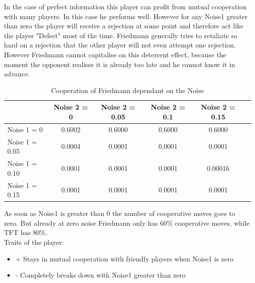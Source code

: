 In the case of perfect information this player can profit from mutual cooperation with many players. In this case he performs well. However for any Noise1 greater than zero the player will receive a rejection at some point and therefore act like the player "Defect" most of the time. Friedmann generally tries to retaliate so hard on a rejection that the other player will not even attempt one rejection. However Friedmann cannot capitalise on this deterrent effect, because the moment the opponent realises it is already too late and he cannot know it in advance.\\

\begin{table}[h]
 \begin{center}
\caption{Cooperation of Friedmann dependant on the Noise} \vspace{3mm}
\begin{tabular}{|l|c|c|c|c|c|}
\hline
   	& Noise 2 = 0 & Noise 2 = 0.05& Noise 2 = 0.1& Noise 2 = 0.15 \\
  \hline
  Noise 1 = 0 	& 0.6002&    0.6000&    0.6000 &   0.6000 \\
 \hline
  Noise 1 = 0.05	 & 0.0004&    0.0001 &   0.0001  &  0.0001 \\
 \hline
  Noise 1 = 0.10 	& 0.0001  &  0.0001&    0.0001 &   0.00016 \\
 \hline
  Noise 1 = 0.15 	& 0.0001  &  0.0001  &  0.0001  &  0.0001 \\
 \hline
\end{tabular}
 \end{center}
\end{table}

As soon as Noise1 is greater than 0 the number of cooperative moves goes to zero. But already at zero noise Friedmann only has 60\% cooperative moves, while TFT has 80\%.\\


Traits of the player:

\renewcommand{\labelitemi}{}

\begin{itemize}
	\item + Stays in mutual cooperation with friendly players when Noise1 is zero
	\item - Completely breaks down with Noise1 greater than zero
\end{itemize}
\renewcommand{\labelitemi}{$\bullet$}

